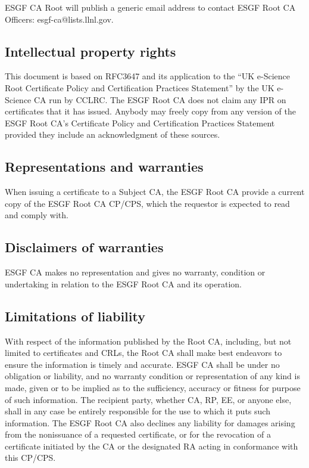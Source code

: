 ESGF CA Root will publish a generic email address to contact
ESGF Root CA Officers: esgf-ca@lists.llnl.gov.

\subsection{Intellectual property rights}\label{intellectual-property-rights}

This document is based on RFC3647 and its application to the ``UK
e-Science Root Certificate Policy and Certification Practices
Statement'' by the UK e-Science CA run by CCLRC. The ESGF Root CA does not claim any IPR on certificates that it has issued. Anybody may
freely copy from any version of the ESGF Root CA's Certificate
Policy and Certification Practices Statement provided they include an
acknowledgment of these sources.

\subsection{Representations and warranties}\label{representations-and-warranties}

When issuing a certificate to a Subject CA, the ESGF Root CA provide a current copy of the ESGF Root CA CP/CPS, which the requestor is expected to read and comply with.

\subsection{Disclaimers of warranties}\label{disclaimers-of-warranties}

ESGF CA makes no representation and gives no warranty, condition or
undertaking in relation to the ESGF Root CA and its operation.

\subsection{Limitations of liability}\label{limitations-of-liability}

With respect of the information published by the Root CA, including, but
not limited to certificates and CRLs, the Root CA shall make best
endeavors to ensure the information is timely and accurate. ESGF CA
shall be under no obligation or liability, and no warranty condition or
representation of any kind is made, given or to be implied as to the
sufficiency, accuracy or fitness for purpose of such information. The
recipient party, whether CA, RP, EE, or anyone else, shall in any case
be entirely responsible for the use to which it puts such information.
The ESGF Root CA also declines any liability for damages arising
from the nonissuance of a requested certificate, or for the revocation
of a certificate initiated by the CA or the designated RA acting in
conformance with this CP/CPS.


